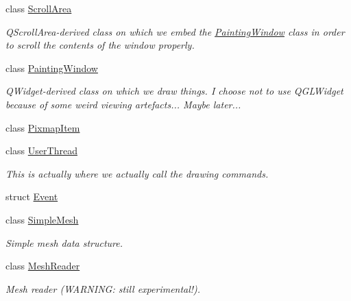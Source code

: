 \begin{DoxyCompactItemize}
class \hyperlink{class_d_o_1_1_scroll_area}{Scroll\-Area}
\begin{DoxyCompactList}\small\item\em Q\-Scroll\-Area-\/derived class on which we embed the \hyperlink{class_d_o_1_1_painting_window}{Painting\-Window} class in order to scroll the contents of the window properly. \end{DoxyCompactList}\item 
class \hyperlink{class_d_o_1_1_painting_window}{Painting\-Window}
\begin{DoxyCompactList}\small\item\em Q\-Widget-\/derived class on which we draw things. I choose not to use Q\-G\-L\-Widget because of some weird viewing artefacts... Maybe later... \end{DoxyCompactList}\item 
class \hyperlink{class_d_o_1_1_pixmap_item}{Pixmap\-Item}
\item 
class \hyperlink{class_d_o_1_1_user_thread}{User\-Thread}
\begin{DoxyCompactList}\small\item\em This is actually where we actually call the drawing commands. \end{DoxyCompactList}\item 
struct \hyperlink{struct_d_o_1_1_event}{Event}
\item 
class \hyperlink{class_d_o_1_1_simple_mesh}{Simple\-Mesh}
\begin{DoxyCompactList}\small\item\em Simple mesh data structure. \end{DoxyCompactList}\item 
class \hyperlink{class_d_o_1_1_mesh_reader}{Mesh\-Reader}
\begin{DoxyCompactList}\small\item\em Mesh reader (W\-A\-R\-N\-I\-N\-G\-: still experimental!). \end{DoxyCompactList}\end{DoxyCompactItemize}
